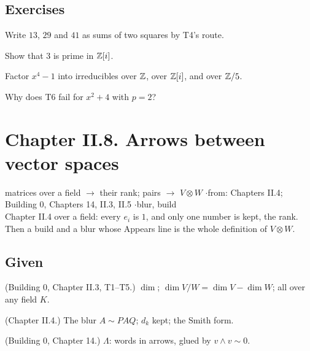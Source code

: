 \subsection*{Exercises}

\begin{lines}
\item[\lab{E1}] Write $13$, $29$ and $41$ as sums of two squares by T4's route.
\item[\lab{E2}] Show that $3$ is prime in $\mathbb{Z}[i]$.
\item[\lab{E3}] Factor $x^4 - 1$ into irreducibles over $\mathbb{Z}$, over $\mathbb{Z}[i]$, and over $\mathbb{Z}/5$.
\item[\lab{E4}] Why does T6 fail for $x^2 + 4$ with $p = 2$?
\end{lines}

\newpage

\section*{Chapter II.8. Arrows between vector spaces}
\begin{center}
{\normalsize matrices over a field $\to$ their rank; pairs $\to$ $V \otimes W$ \quad$\cdot$\quad from: Chapters II.4; Building 0, Chapters 14, II.3, II.5 \quad$\cdot$\quad blur, build}\\[4pt]
{\small Chapter II.4 over a field: every $e_i$ is $1$, and only one number is kept, the rank. Then a build and a blur whose Appears line is the whole definition of $V \otimes W$.}
\end{center}

\subsection*{Given}

\begin{lines}
\item[\lab{G1}] (Building 0, Chapter II.3, T1--T5.) $\dim$; $\dim V/W = \dim V - \dim W$; all over any field $K$.
\item[\lab{G2}] (Chapter II.4.) The blur $A \sim PAQ$; $d_k$ kept; the Smith form.
\item[\lab{G3}] (Building 0, Chapter 14.) $\Lambda$: words in arrows, glued by $v \wedge v \sim 0$.
\end{lines}

